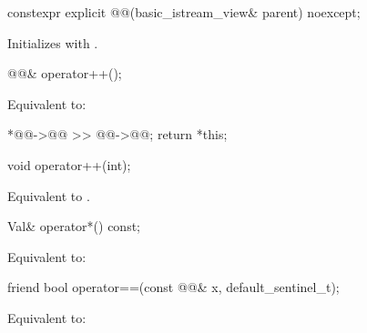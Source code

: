 %
\begin{itemdecl}
constexpr explicit @@(basic_istream_view& parent) noexcept;
\end{itemdecl}

\begin{itemdescr}
\pnum
\effects
Initializes  with .
\end{itemdescr}

%
\begin{itemdecl}
@@& operator++();
\end{itemdecl}

\begin{itemdescr}
\pnum
\effects
Equivalent to:
\begin{codeblock}
*@@->@@ >> @@->@@;
return *this;
\end{codeblock}
\end{itemdescr}

%
\begin{itemdecl}
void operator++(int);
\end{itemdecl}

\begin{itemdescr}
\pnum
\effects
Equivalent to .
\end{itemdescr}

%
\begin{itemdecl}
Val& operator*() const;
\end{itemdecl}

\begin{itemdescr}
\pnum
\effects
Equivalent to: 
\end{itemdescr}

%
\begin{itemdecl}
friend bool operator==(const @@& x, default_sentinel_t);
\end{itemdecl}

\begin{itemdescr}
\pnum
\effects
Equivalent to: 
\end{itemdescr}

